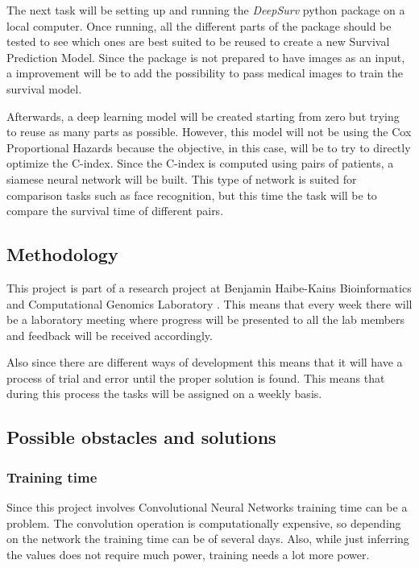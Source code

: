 The next task will be setting up and running the \emph{DeepSurv} python package on a local
computer. Once running, all the different parts of the package should be tested to see which
ones are best suited to be reused to create a new Survival Prediction Model. Since the package
is not prepared to have images as an input, a improvement will be to add the possibility to 
pass medical images to train the survival model.
\cite{medical:DeepSurv-github}

Afterwards, a deep learning model will be created starting from zero but trying to reuse
as many parts as possible. However, this model will not be using the Cox Proportional
Hazards because the objective, in this case, will be to try to directly optimize the C-index.
Since the C-index is computed using pairs of patients, a siamese neural network will be built.
This type of network is suited for comparison tasks such as face recognition, but this 
time the task will be to compare the survival time of different pairs.

\subsection{Methodology}

This project is part of a research project at Benjamin Haibe-Kains Bioinformatics and 
Computational Genomics Laboratory \cite{BHKLab}. This means that every week there will be a 
laboratory meeting where progress will be presented to all the lab members and feedback will 
be received accordingly.

Also since there are different ways of development this means that it will have a process of trial
and error until the proper solution is found. This means that during this process the
tasks will be assigned on a weekly basis.


\subsection{Possible obstacles and solutions}

\subsubsection{Training time}

Since this project involves Convolutional Neural Networks training time can be a problem. 
The convolution operation is computationally expensive, so depending on the network the 
training time can be of several days. Also, while just inferring the values does not require
much power, training needs a lot more power. 

